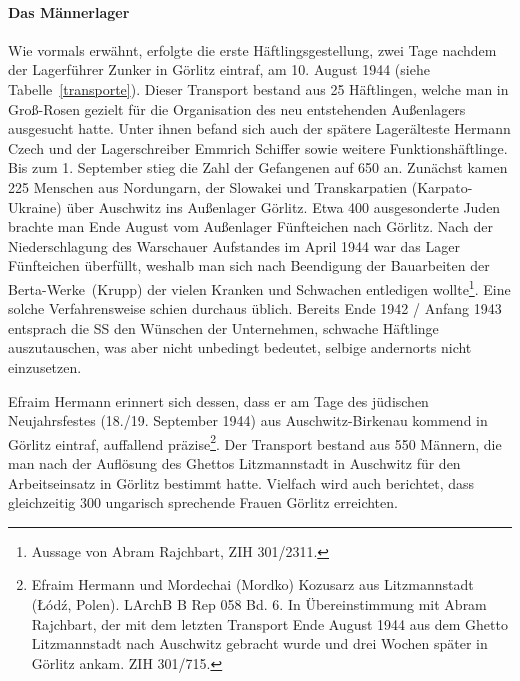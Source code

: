\paragraph{Das Männerlager}
Wie vormals erwähnt, erfolgte die erste \glqq Häftlingsgestellung\grqq, zwei Tage nachdem der\label{vorauskommando} Lagerführer Zunker in Görlitz eintraf, am 10. August 1944 (siehe Tabelle~\ref{transporte}). Dieser Transport bestand aus 25 Häftlingen, welche man in Groß-Rosen gezielt für die Organisation des neu entstehenden Außenlagers ausgesucht hatte. Unter ihnen befand sich auch der spätere Lagerälteste Hermann Czech und der Lagerschreiber Emmrich Schiffer sowie weitere Funktionshäftlinge. Bis zum 1. September stieg die Zahl der Gefangenen auf 650 an. Zunächst kamen 225 Menschen aus Nordungarn, der Slowakei und Transkarpatien (Karpato-Ukraine) über Auschwitz ins Außenlager Görlitz.
\newline
Etwa 400 ausgesonderte Juden brachte man Ende August vom Außenlager Fünfteichen nach Görlitz. Nach der Niederschlagung des Warschauer Aufstandes im April 1944 war das Lager Fünfteichen überfüllt, weshalb man sich nach Beendigung der Bauarbeiten der \glqq Berta-Werke\grqq~(Krupp) der vielen Kranken und Schwachen entledigen wollte\footnote{Aussage von Abram Rajchbart, ZIH 301/2311.}. Eine solche Verfahrensweise schien durchaus üblich. Bereits Ende 1942 / Anfang 1943 entsprach die SS den Wünschen der Unternehmen, schwache Häftlinge auszutauschen, was aber nicht unbedingt bedeutet, selbige andernorts nicht einzusetzen.\newline


Efraim Hermann erinnert sich dessen, dass er am Tage des jüdischen Neujahrsfestes (18./19. September 1944) aus Auschwitz-Birkenau kommend in Görlitz eintraf, auffallend präzise\footnote{Efraim Hermann und Mordechai (Mordko) Kozusarz aus Litzmannstadt (\L \'od\'z, Polen). LArchB B Rep 058 Bd. 6. In Übereinstimmung mit Abram Rajchbart, der mit dem letzten Transport Ende August 1944 aus dem Ghetto Litzmannstadt nach Auschwitz gebracht wurde und drei Wochen später in Görlitz ankam. ZIH 301/715.}. Der Transport bestand aus 550 Männern, die man nach der Auflösung des Ghettos Litzmannstadt in Auschwitz für den Arbeitseinsatz in Görlitz bestimmt hatte. Vielfach wird auch berichtet, dass gleichzeitig 300 ungarisch sprechende Frauen Görlitz erreichten.\newline

